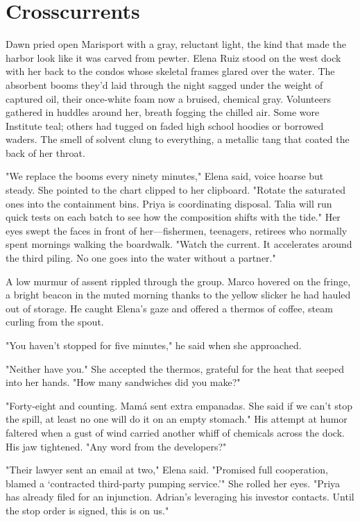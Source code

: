 \chapter{Crosscurrents}

Dawn pried open Marisport with a gray, reluctant light, the kind that made the harbor look like it was carved from pewter. Elena Ruiz stood on the west dock with her back to the condos whose skeletal frames glared over the water. The absorbent booms they'd laid through the night sagged under the weight of captured oil, their once-white foam now a bruised, chemical gray. Volunteers gathered in huddles around her, breath fogging the chilled air. Some wore Institute teal; others had tugged on faded high school hoodies or borrowed waders. The smell of solvent clung to everything, a metallic tang that coated the back of her throat.

"We replace the booms every ninety minutes," Elena said, voice hoarse but steady. She pointed to the chart clipped to her clipboard. "Rotate the saturated ones into the containment bins. Priya is coordinating disposal. Talia will run quick tests on each batch to see how the composition shifts with the tide." Her eyes swept the faces in front of her—fishermen, teenagers, retirees who normally spent mornings walking the boardwalk. "Watch the current. It accelerates around the third piling. No one goes into the water without a partner."

A low murmur of assent rippled through the group. Marco hovered on the fringe, a bright beacon in the muted morning thanks to the yellow slicker he had hauled out of storage. He caught Elena's gaze and offered a thermos of coffee, steam curling from the spout.

"You haven't stopped for five minutes," he said when she approached.

"Neither have you." She accepted the thermos, grateful for the heat that seeped into her hands. "How many sandwiches did you make?"

"Forty-eight and counting. Mamá sent extra empanadas. She said if we can't stop the spill, at least no one will do it on an empty stomach." His attempt at humor faltered when a gust of wind carried another whiff of chemicals across the dock. His jaw tightened. "Any word from the developers?"

"Their lawyer sent an email at two," Elena said. "Promised full cooperation, blamed a `contracted third-party pumping service.'" She rolled her eyes. "Priya has already filed for an injunction. Adrian's leveraging his investor contacts. Until the stop order is signed, this is on us."

